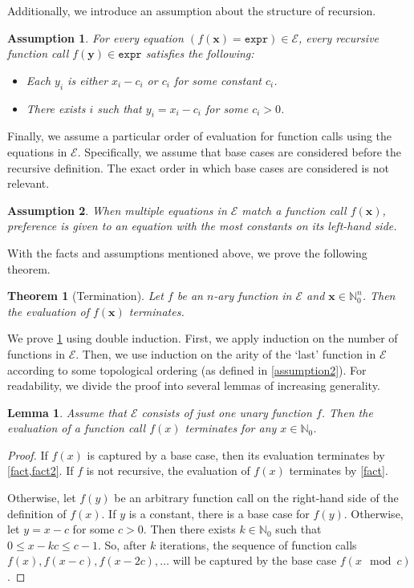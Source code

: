 \documentclass{article}
\newtheorem{theorem}{Theorem}
\newtheorem{lemma}{Lemma}
\newtheorem{assumption}{Assumption}
\theoremstyle{remark}
\newcommand{\expr}{\mathtt{expr}}
\begin{document}
Additionally, we introduce an assumption about the structure of recursion.

\begin{assumption}\label{assumption4}
  For every equation $(f(\mathbf{x}) = \expr) \in \mathcal{E}$, every recursive
  function call $f(\mathbf{y}) \in \expr$ satisfies the
  following:
  \begin{itemize}
    \item Each $y_{i}$ is either $x_{i} - c_{i}$ or $c_{i}$ for some constant
          $c_{i}$.
    \item There exists $i$ such that $y_{i} = x_{i} - c_{i}$ for some
          $c_{i} > 0$.
  \end{itemize}
\end{assumption}

Finally, we assume a particular order of evaluation for function calls using the
equations in $\mathcal{E}$. Specifically, we assume that base cases are
considered before the recursive definition. The exact order in which base cases
are considered is not relevant.

\begin{assumption}
  When multiple equations in $\mathcal{E}$ match a function call
  $f(\mathbf{x})$, preference is given to an equation with the most constants on
  its left-hand side.
\end{assumption}

With the facts and assumptions mentioned above, we prove the following theorem.

\begin{theorem}[Termination]\label{thm:halting}
  Let $f$ be an $n$-ary function in $\mathcal{E}$ and
  $\mathbf{x} \in \mathbb{N}_{0}^{n}$. Then the evaluation of $f(\mathbf{x})$
  terminates.
\end{theorem}

We prove \cref{thm:halting} using double induction. First, we apply induction on
the number of functions in $\mathcal{E}$. Then, we use induction on the arity of
the `last' function in $\mathcal{E}$ according to some topological ordering (as
defined in \cref{assumption2}). For readability, we divide the proof into
several lemmas of increasing generality.

\begin{lemma}\label{lemma:oneunary}
  Assume that $\mathcal{E}$ consists of just \emph{one unary} function $f$. Then
  the evaluation of a function call $f(x)$ terminates for any
  $x \in \mathbb{N}_{0}$.
\end{lemma}
\begin{proof}
  If $f(x)$ is captured by a base case, then its evaluation terminates by
  \cref{fact,fact2}. If $f$ is not recursive, the evaluation of
  $f(x)$ terminates by \cref{fact}.

  Otherwise, let $f(y)$ be an arbitrary function call on the right-hand side of
  the definition of $f(x)$. If $y$ is a constant, there is a base case for
  $f(y)$. Otherwise, let $y = x - c$ for some $c > 0$. Then there exists
  $k \in \mathbb{N}_{0}$ such that $0 \le x - kc \le c-1$. So, after $k$
  iterations, the sequence of function calls $f(x), f(x-c), f(x-2c),\dots$ will
  be captured by the base case $f(x \mod c)$.
\end{proof}
\end{document}
